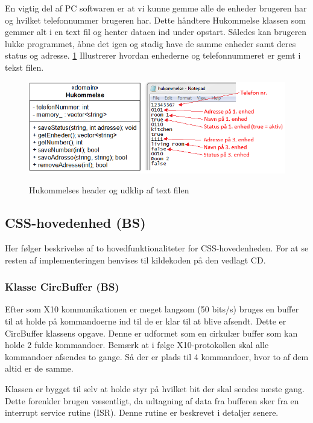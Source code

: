 \clearpage

En vigtig del af PC softwaren er at vi kunne gemme alle de enheder brugeren har og hvilket telefonnummer brugeren har. Dette håndtere Hukommelse klassen som gemmer alt i en text fil og henter dataen ind under opstart. Således kan brugeren lukke programmet, åbne det igen og stadig have de samme enheder samt deres status og adresse. \ref{fig:Hukommelses header og udklip af text filen} Illustrerer hvordan enhederne og telefonnummeret er gemt i tekst filen.

\begin{figure}[htbp] \centering
{\includegraphics[width=\textwidth]{billeder/uml/pc_dataview}}
\caption{Hukommelses header og udklip af text filen}
\label{fig:Hukommelses header og udklip af text filen}
\end{figure}

\subsection{CSS-hovedenhed (BS)}
Her følger beskrivelse af to hovedfunktionaliteter for CSS-hovedenheden. For at se resten af implementeringen henvises til kildekoden på den vedlagt CD.

\subsubsection{Klasse CircBuffer (BS)}
Efter som X10 kommunikationen er meget langsom (50 bits/s) bruges en buffer til at holde på kommandoerne ind til de er klar til at blive afsendt. Dette er CircBuffer klassens opgave.
Denne er udformet som en cirkulær buffer som kan holde 2 fulde kommandoer. Bemærk at i følge X10-protokollen skal alle kommandoer afsendes to gange. Så der er plads til 4 kommandoer, hvor to af dem altid er de samme.

Klassen er bygget til selv at holde styr på hvilket bit der skal sendes næste gang. Dette forenkler brugen væsentligt, da udtagning af data fra bufferen sker fra en interrupt service rutine (ISR). Denne rutine er beskrevet i detaljer senere.

